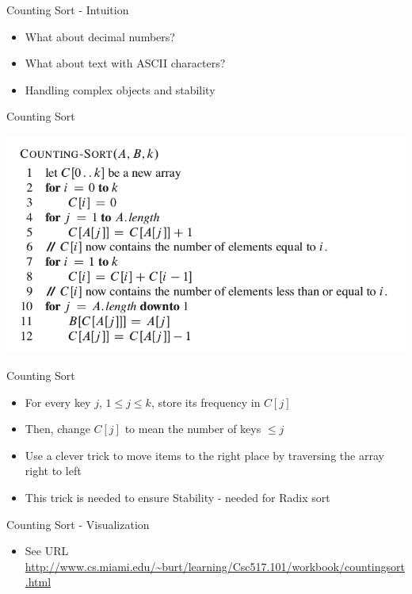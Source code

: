 \documentclass{beamer}
\begin{document}
\begin{frame}{Counting Sort - Intuition}
\begin{itemize}
\item What about decimal numbers?
\item What about text with ASCII characters?
\item Handling complex objects and stability
\end{itemize}
\end{frame}


\begin{frame}{Counting Sort}
\begin{center}
    \includegraphics[scale=0.4]{countingSortPseudoCode.png}
\end{center}
\end{frame}


\begin{frame}{Counting Sort}
\begin{itemize}
\item For every key $j$, $1 \leq j \leq k$, store its frequency in $C[j]$
\item Then, change $C[j]$ to mean the number of keys $\leq j$
\item Use a clever trick to move items to the right place by traversing the array right to left
\item This trick is needed to ensure Stability - needed for Radix sort
\end{itemize}
\end{frame}



\begin{frame}{Counting Sort - Visualization}
\begin{itemize}
\item See URL \url{http://www.cs.miami.edu/~burt/learning/Csc517.101/workbook/countingsort.html} 
\end{itemize}
\end{frame}
\end{document}
